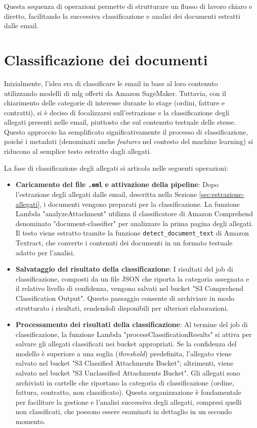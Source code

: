 Questa sequenza di operazioni permette di strutturare un flusso di lavoro chiaro e diretto, facilitando la successiva classificazione e analisi dei documenti estratti dalle email.

\section{Classificazione dei documenti}
\label{sec:classificazione-documenti}
Inizialmente, l'idea era di classificare le email in base al loro contenuto utilizzando modelli di \gls{mlg} offerti da Amazon SageMaker. Tuttavia, con il chiarimento delle categorie di interesse durante lo stage (ordini, fatture e contratti), si è deciso di focalizzarsi sull'estrazione e la classificazione degli allegati presenti nelle email, piuttosto che sul contenuto testuale delle stesse. Questo approccio ha semplificato significativamente il processo di classificazione, poiché i metadati (denominati anche \textit{features} nel contesto del machine learning) si riducono al semplice testo estratto dagli allegati.

La fase di classificazione degli allegati si articola nelle seguenti operazioni:

\begin{itemize}
    \item \textbf{Caricamento del file \texttt{.eml} e attivazione della pipeline}: Dopo l'estrazione degli allegati dalle email, descritta nella Sezione \ref{sec:estrazione-allegati}, i documenti vengono preparati per la classificazione. La funzione Lambda "analyzeAttachment" utilizza il classificatore di Amazon Comprehend denominato "document-classifier" per analizzare la prima pagina degli allegati. Il testo viene estratto tramite la funzione \texttt{detect\_document\_text} di Amazon Textract, che converte i contenuti dei documenti in un formato testuale adatto per l'analisi.

    \item \textbf{Salvataggio del risultato della classificazione}: I risultati del job di classificazione, composti da un file JSON che riporta la categoria assegnata e il relativo livello di confidenza, vengono salvati nel bucket "S3 Comprehend Classification Output". Questo passaggio consente di archiviare in modo strutturato i risultati, rendendoli disponibili per ulteriori elaborazioni.

    \item \textbf{Processamento dei risultati della classificazione}: Al termine del job di classificazione, la funzione Lambda "processClassificationResults" si attiva per salvare gli allegati classificati nei bucket appropriati. Se la confidenza del modello è superiore a una soglia (\textit{threshold}) predefinita, l'allegato viene salvato nel bucket "S3 Classified Attachments Bucket"; altrimenti, viene salvato nel bucket "S3 Unclassified Attachments Bucket". Gli allegati sono archiviati in cartelle che riportano la categoria di classificazione (ordine, fattura, contratto, non classificato). Questa organizzazione è fondamentale per facilitare la gestione e l'analisi successiva degli allegati, compresi quelli non classificati, che possono essere esaminati in dettaglio in un secondo momento.
\end{itemize}

